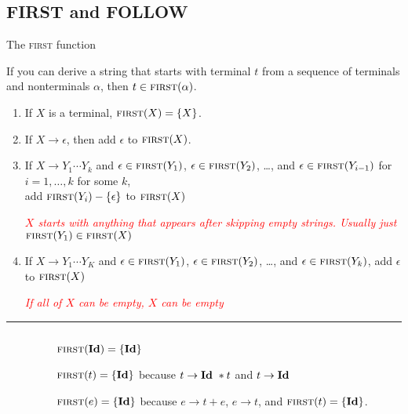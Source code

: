 \documentclass{plt}
\begin{document}
\def\highlight<#1>#2{
  {\temporal<#1>{\color{black!30}}{}{\color{black!30}}#2}
}

\subsection{FIRST and FOLLOW}

\newcommand\first{\textsc{first}}
\newcommand\follow{\textsc{follow}}

\begin{frame}{The \first{} function}

\parskip=5pt

If you can derive a string that starts with terminal $t$ from a
sequence of terminals and nonterminals $\alpha$, then $t \in
\first(\alpha)$.

\begin{enumerate}
\item If $X$ is a terminal, $\first(X) = \{ X \}$.

\item If $X \rightarrow \epsilon$, then add $\epsilon$ to $\first(X)$.

\item If $X \rightarrow Y_1 \cdots Y_k$ and
  $\epsilon \in \first(Y_1)$,
  $\epsilon \in \first(Y_2)$, \ldots, and $\epsilon \in
  \first(Y_{i-1})$ for $i=1,\ldots, k$ for some $k$, \\ \quad add
  $\first(Y_i) - \{ \epsilon \}$ to $\first(X)$

    \textcolor{red}{\emph{$X$ starts with anything that appears after
      skipping empty strings. Usually just $\first(Y_1) \in \first(X)$}}

\item If $X \rightarrow Y_1 \cdots Y_K$ and
  $\epsilon \in \first(Y_1)$,
  $\epsilon \in \first(Y_2)$, \ldots, and $\epsilon \in \first(Y_k)$, add
  $\epsilon$ to $\first(X)$

    \textcolor{red}{\emph{If all of $X$ can be empty, $X$ can be empty}}  
\end{enumerate}

\hrule

\vspace{5pt}

\begin{columns}
\begin{column}{0.3\textwidth}
\grammarone
\end{column}
\begin{column}{0.7\textwidth}
\parskip=5pt
$\first(\id) = \{ \id \}$

$\first(t) = \{ \id \}$ because $t \rightarrow \textbf{Id}\ * t$ and $t
  \rightarrow \textbf{Id}$

$\first(e) = \{ \id \}$ because $e \rightarrow t + e$, $e \rightarrow
  t$, and $\first(t) = \{ \id \}$.

\end{column}
\end{columns}

\end{frame}
\end{document}
